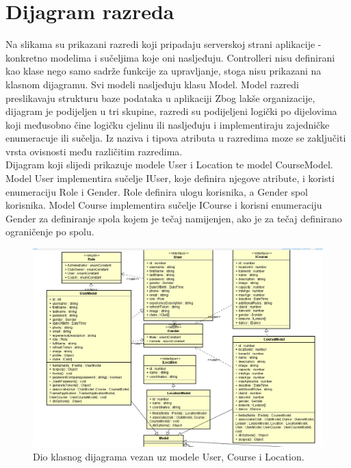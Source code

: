 			\eject
			
			
		\section{Dijagram razreda}
		
			\noindent Na slikama su prikazani razredi koji pripadaju serverskoj strani aplikacije - konkretno modelima i 
			sučeljima koje oni nasljeđuju. Controlleri nisu definirani kao klase nego samo sadrže funkcije za upravljanje, stoga nisu 
			prikazani na klasnom dijagramu.
			Svi modeli nasljeđuju klasu Model. Model razredi preslikavaju strukturu baze podataka u aplikaciji
			Zbog lakše organizacije, dijagram je podijeljen u tri skupine, razredi su podijeljeni logički po dijelovima koji međusobno čine 
			logičku cjelinu ili nasljeđuju i implementiraju zajedničke enumeracuje ili sučelja.
			Iz naziva i tipova atributa u razredima moze se zaključiti vrsta ovisnosti među različitim razredima. \\

			\noindent Dijagram koji slijedi prikazuje modele User i Location te 
			model CourseModel.
			Model User implementira sučelje IUser, koje definira njegove atribute, i koristi enumeraciju Role i Gender. Role definira ulogu korisnika, a
			Gender spol korisnika. Model Course implementira sučelje ICourse i korisni enumeraciju Gender za definiranje spola kojem je tečaj namijenjen, ako je za tečaj definirano ograničenje po spolu.
			\\
			\begin{figure}[H]
				\includegraphics[scale=1.0]{slike/class1.png}
				\centering
				\caption{Dio klasnog dijagrama vezan uz modele User, Course i Location.}
				\label{fig:class1}
			\end{figure}		
			
